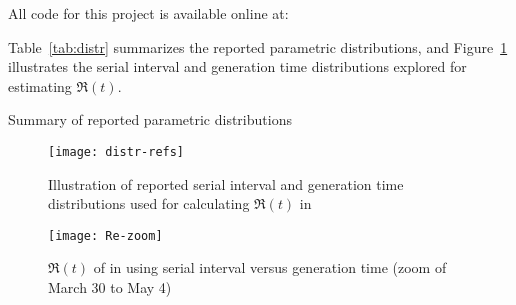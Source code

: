 All code for this project is available online at:\\
\par
Table~\ref{tab:distr} summarizes
the reported parametric \covid distributions, and
Figure~\ref{fig:distr-refs} illustrates
the serial interval and generation time distributions
explored for estimating $\Re(t)$.
\par
\begin{table}[h]
  \caption{Summary of reported parametric \covid distributions}
  
  \label{tab:distr}
\end{table}
\par
\begin{figure}[h]
  \centering
  \texttt{[image: distr-refs]}
  \caption{Illustration of reported serial interval and generation time
    distributions used for calculating $\Re(t)$ in \covid}
  \label{fig:distr-refs}
\end{figure}
\par
\begin{figure}[h]
  \centering
  \texttt{[image: Re-zoom]}
  \caption{$\Re(t)$ of \covid in \gta using
    serial interval versus generation time
    (zoom of March 30 to May 4)}
  \label{fig:Re-zoom}
\end{figure}